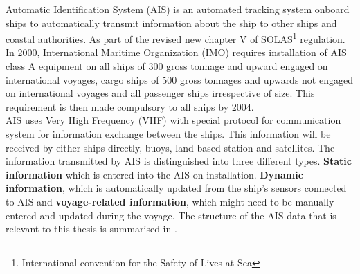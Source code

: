 Automatic Identification System (AIS) is an automated tracking system onboard ships to automatically transmit information about the ship to other ships and coastal authorities. As part of the revised new chapter V of SOLAS\footnote{International convention for the Safety of Lives at Sea} regulation. In 2000, International Maritime Organization (IMO) requires installation of AIS class A equipment on all ships of 300 gross tonnage and upward engaged on international voyages, cargo ships of 500 gross tonnages and upwards not engaged on international voyages and all passenger ships irrespective of size. This requirement is then made compulsory to all ships by 2004. \citep{Rakke2016,webimo.2014}\\

AIS uses Very High Frequency (VHF) with special protocol for communication system for information exchange between the ships. This information will be received by either ships directly, buoys, land based station and satellites. The information transmitted by AIS is distinguished into three different types. \textbf{Static information} which is entered into the AIS on installation. \textbf{Dynamic information}, which is automatically updated from the ship's sensors connected to AIS and \textbf{voyage-related information}, which might need to be manually entered and updated during the voyage. The structure of the AIS data that is relevant to this thesis is summarised in \citep{webimo.2014}.\\

